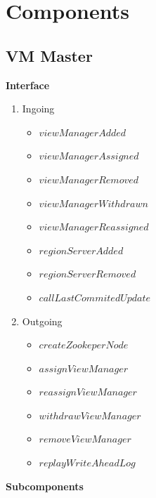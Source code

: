 \chapter{Components}
\label{chapter:Components}

\section{VM Master}


\textbf{Interface}

\begin{enumerate}
	\item Ingoing
	\begin{itemize}
		\item $viewManagerAdded$
		\item $viewManagerAssigned$
		\item $viewManagerRemoved$
		\item $viewManagerWithdrawn$
		\item $viewManagerReassigned$
		\item $regionServerAdded$
		\item $regionServerRemoved$
		\item $callLastCommitedUpdate$
	\end{itemize}
	\item Outgoing
	\begin{itemize}
		\item $createZookeperNode$
		\item $assignViewManager$
		\item $reassignViewManager$
		\item $withdrawViewManager$
		\item $removeViewManager$
		\item $replayWriteAheadLog$

	\end{itemize}
\end{enumerate}


\textbf{Subcomponents}

